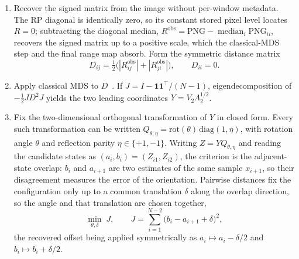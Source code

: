 \documentclass[preprint,12pt]{elsarticle}
\begin{document}
\begin{enumerate}
\item Recover the signed matrix from the image without per-window metadata. The RP diagonal is identically zero, so its constant stored pixel level locates \(R=0\); subtracting the diagonal median, \(R^{\mathrm{obs}}=\mathrm{PNG}-\operatorname{median}_i\mathrm{PNG}_{ii}\), recovers the signed matrix up to a positive scale, which the classical-MDS step and the final range map absorb. Form the symmetric distance matrix
\[
D_{ij}=\tfrac12\bigl(|R^{\mathrm{obs}}_{ij}|+|R^{\mathrm{obs}}_{ji}|\bigr),\qquad D_{ii}=0.
\]
\item Apply classical MDS to \(D\)~\cite{Torgerson1952}. If \(J=I-\mathbf1\mathbf1^\top/(N-1)\), eigendecomposition of \(-\tfrac12JD^2J\) yields the two leading coordinates \(Y=V_2\Lambda_2^{1/2}\).

\item Fix the two-dimensional orthogonal transformation of \(Y\) in closed form. Every such transformation can be written \(Q_{\theta,\eta}=\mathrm{rot}(\theta)\,\mathrm{diag}(1,\eta)\), with rotation angle \(\theta\) and reflection parity \(\eta\in\{+1,-1\}\). Writing \(Z=YQ_{\theta,\eta}\) and reading the candidate states as \((a_i,b_i)=(Z_{i1},Z_{i2})\), the criterion is the adjacent-state overlap: \(b_i\) and \(a_{i+1}\) are two estimates of the same sample \(x_{i+1}\), so their disagreement measures the error of the orientation. Pairwise distances fix the configuration only up to a common translation \(\delta\) along the overlap direction, so the angle and that translation are chosen together,
\[
\min_{\theta,\delta}\;J,
\qquad
J=\sum_{i=1}^{N-2}{\bigl(b_i-a_{i+1}+\delta\bigr)}^2,
\]
the recovered offset being applied symmetrically as \(a_i\mapsto a_i-\delta/2\) and \(b_i\mapsto b_i+\delta/2\).


\end{enumerate}
\end{document}

